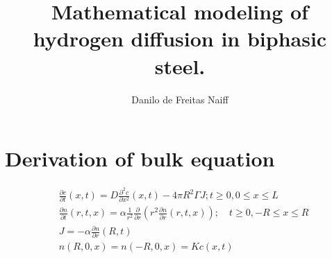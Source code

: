 \documentclass[]{article}
\title{Mathematical modeling of hydrogen diffusion in biphasic steel.}
\author{Danilo de Freitas Naiff}
\newcommand{\pderiv}[2]{\frac{\partial #1}{\partial #2}}
\begin{document}
\maketitle

\begin{abstract}

\end{abstract}

\section{Derivation of bulk equation}
\begin{equation}\label{originalproblem}
	\begin{split}
	& \pderiv{c}{t}(x,t) = D \frac{\partial^2 c}{\partial x^2}(x,t) - 4 \pi R^2 \Gamma J; t \geq 0, 0 \leq x \leq L\\
	& \pderiv{n}{t}(r,t,x) = \alpha \frac{1}{r^2} \pderiv{}{r} \left( r^2 \pderiv{n}{r}(r,t,x)\right); \quad t \geq 0, -R \leq x \leq R \\
	& J = -\alpha \pderiv{n}{r}(R,t) \\
	& n(R,0,x) = n(-R,0,x) = K c(x,t) \\
	\end{split}
\end{equation}
\end{document}
